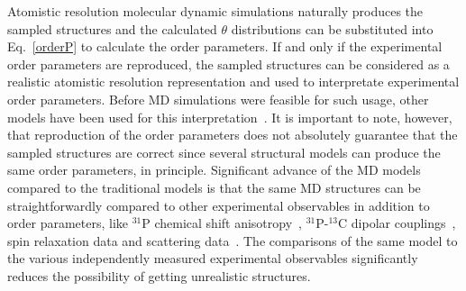 \documentclass[aps,prl,superscriptaddress,twocolumn]{revtex4}
\begin{document}
Atomistic resolution molecular dynamic simulations naturally produces the
sampled structures and the calculated $\theta$ distributions can be substituted
into Eq.~\ref{orderP} to calculate the order parameters.
If and only if the experimental order parameters are
reproduced, the sampled structures can be considered as a realistic
atomistic resolution representation and used to interpretate experimental order parameters.
Before MD simulations were feasible for such usage, other models have been used for 
this interpretation~\cite{seelig74,gally75,seelig77,seelig78,strenk85,baenziger91,hong95b,bruzik97}.
It is important to note, however, that reproduction of the order parameters does not absolutely 
guarantee that the sampled structures are correct since several structural models 
can produce the same order parameters, in principle. 
Significant advance of the MD models compared to the traditional models is that the same MD 
structures can be straightforwardly compared to other experimental observables in addition to order parameters, 
like $^{31}$P chemical shift anisotropy~\cite{chowdhary13}, $^{31}$P-$^{13}$C dipolar couplings~\cite{prakash10},
spin relaxation data \cite{ferreira15} and scattering data~\cite{kucerka10}. The comparisons
of the same model to the various independently measured experimental observables significantly reduces the 
possibility of getting unrealistic structures.
\end{document}
